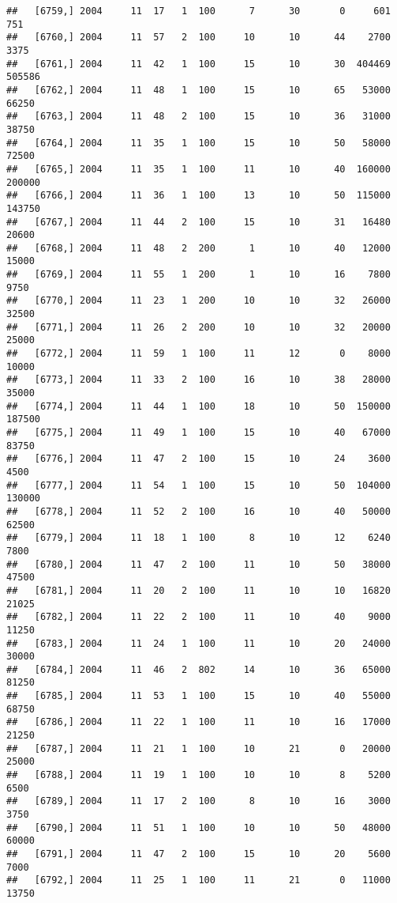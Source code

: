 \documentclass{article}\usepackage[]{graphicx}\usepackage[]{color}
\makeatletter
\newenvironment{kframe}{%
 \def\at@end@of@kframe{}%
 \ifinner\ifhmode%
  \def\at@end@of@kframe{\end{minipage}}%
  \begin{minipage}{\columnwidth}%
 \fi\fi%
 \def\FrameCommand##1{\hskip\@totalleftmargin \hskip-\fboxsep
 \colorbox{shadecolor}{##1}\hskip-\fboxsep
     \hskip-\linewidth \hskip-\@totalleftmargin \hskip\columnwidth}%
 \MakeFramed {\advance\hsize-\width
   \@totalleftmargin\z@ \linewidth\hsize
   \@setminipage}}%
 {\par\unskip\endMakeFramed%
 \at@end@of@kframe}
\newenvironment{knitrout}{}{} %
\makeatother
\begin{document}
\begin{knitrout}
\begin{kframe}
\begin{verbatim}
##   [6759,] 2004     11  17   1  100      7      30       0     601     751
##   [6760,] 2004     11  57   2  100     10      10      44    2700    3375
##   [6761,] 2004     11  42   1  100     15      10      30  404469  505586
##   [6762,] 2004     11  48   1  100     15      10      65   53000   66250
##   [6763,] 2004     11  48   2  100     15      10      36   31000   38750
##   [6764,] 2004     11  35   1  100     15      10      50   58000   72500
##   [6765,] 2004     11  35   1  100     11      10      40  160000  200000
##   [6766,] 2004     11  36   1  100     13      10      50  115000  143750
##   [6767,] 2004     11  44   2  100     15      10      31   16480   20600
##   [6768,] 2004     11  48   2  200      1      10      40   12000   15000
##   [6769,] 2004     11  55   1  200      1      10      16    7800    9750
##   [6770,] 2004     11  23   1  200     10      10      32   26000   32500
##   [6771,] 2004     11  26   2  200     10      10      32   20000   25000
##   [6772,] 2004     11  59   1  100     11      12       0    8000   10000
##   [6773,] 2004     11  33   2  100     16      10      38   28000   35000
##   [6774,] 2004     11  44   1  100     18      10      50  150000  187500
##   [6775,] 2004     11  49   1  100     15      10      40   67000   83750
##   [6776,] 2004     11  47   2  100     15      10      24    3600    4500
##   [6777,] 2004     11  54   1  100     15      10      50  104000  130000
##   [6778,] 2004     11  52   2  100     16      10      40   50000   62500
##   [6779,] 2004     11  18   1  100      8      10      12    6240    7800
##   [6780,] 2004     11  47   2  100     11      10      50   38000   47500
##   [6781,] 2004     11  20   2  100     11      10      10   16820   21025
##   [6782,] 2004     11  22   2  100     11      10      40    9000   11250
##   [6783,] 2004     11  24   1  100     11      10      20   24000   30000
##   [6784,] 2004     11  46   2  802     14      10      36   65000   81250
##   [6785,] 2004     11  53   1  100     15      10      40   55000   68750
##   [6786,] 2004     11  22   1  100     11      10      16   17000   21250
##   [6787,] 2004     11  21   1  100     10      21       0   20000   25000
##   [6788,] 2004     11  19   1  100     10      10       8    5200    6500
##   [6789,] 2004     11  17   2  100      8      10      16    3000    3750
##   [6790,] 2004     11  51   1  100     10      10      50   48000   60000
##   [6791,] 2004     11  47   2  100     15      10      20    5600    7000
##   [6792,] 2004     11  25   1  100     11      21       0   11000   13750

\end{verbatim}
\end{kframe}
\end{knitrout}
\end{document}
